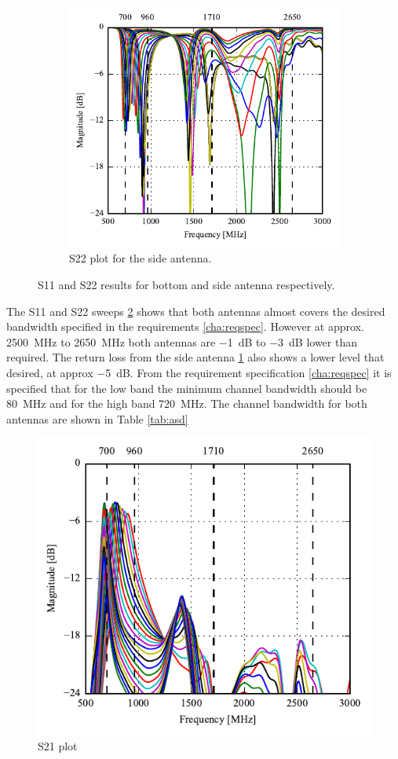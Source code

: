 \begin{figure}[htbp]
\begin{subfigure}[b]{0.49\linewidth}
        \includegraphics{img/tech_sol/monopole/s22_sweep}
        \caption{S22 plot for the side antenna.}
        \label{fig:ant1_s22}
    \end{subfigure}
    \caption{S11 and S22 results for bottom and side antenna respectively.}
    \label{fig:ant1_sparam}
\end{figure}
The S11 and S22 sweeps \ref{fig:ant1_sparam} shows that both antennas almost covers the desired bandwidth specified in the requirements \ref{cha:reqspec}. However at approx. \SI{2500}{MHz} to \SI{2650}{MHz} both antennas are \SI{-1}{dB} to \SI{-3}{dB} lower than required. The return loss from the side antenna  
\ref{fig:ant1_s22} also shows a lower level that desired, at approx \SI{-5}{dB}. From the requirement specification \ref{cha:reqspec} it is specified that for the low band the minimum channel bandwidth should be \SI{80}{MHz} and for the high band \SI{720}{MHz}. The channel bandwidth for both antennas are shown in Table \ref{tab:asd}     

\begin{figure}[htbp]%
  \centering
  \includegraphics{img/tech_sol/monopole/s21_sweep}
  \caption{S21 plot}
  \label{fig:ant1_s21}
\end{figure}



